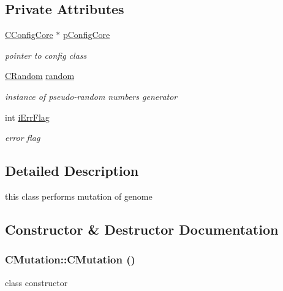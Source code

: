 \subsection*{Private Attributes}
\begin{DoxyCompactItemize}
\item 
\hypertarget{classCMutation_af548105d80999d51b7c4ed8b5ebe2175}{
\hyperlink{classCConfigCore}{CConfigCore} $\ast$ \hyperlink{classCMutation_af548105d80999d51b7c4ed8b5ebe2175}{pConfigCore}}
\label{classCMutation_af548105d80999d51b7c4ed8b5ebe2175}

\begin{DoxyCompactList}\small\item\em pointer to config class \item\end{DoxyCompactList}\item 
\hypertarget{classCMutation_afd64020d1eaf41e339ee5e03e353cfce}{
\hyperlink{classCRandom}{CRandom} \hyperlink{classCMutation_afd64020d1eaf41e339ee5e03e353cfce}{random}}
\label{classCMutation_afd64020d1eaf41e339ee5e03e353cfce}

\begin{DoxyCompactList}\small\item\em instance of pseudo-\/random numbers generator \item\end{DoxyCompactList}\item 
\hypertarget{classCMutation_a8cb735d26df38e977e032572bb2fdb23}{
int \hyperlink{classCMutation_a8cb735d26df38e977e032572bb2fdb23}{iErrFlag}}
\label{classCMutation_a8cb735d26df38e977e032572bb2fdb23}

\begin{DoxyCompactList}\small\item\em error flag \item\end{DoxyCompactList}\end{DoxyCompactItemize}


\subsection{Detailed Description}
this class performs mutation of genome 

\subsection{Constructor \& Destructor Documentation}
\hypertarget{classCMutation_ad52e2648f1e7a288706dfa1d429b74c4}{
\subsubsection[{CMutation}]{\setlength{\rightskip}{0pt plus 5cm}CMutation::CMutation ()}}
\label{classCMutation_ad52e2648f1e7a288706dfa1d429b74c4}
class constructor 

